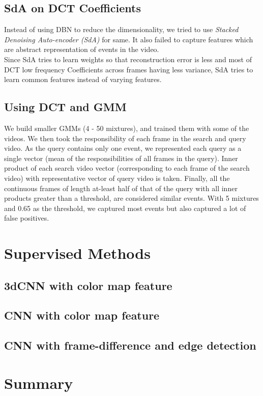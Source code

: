 \subsection{SdA on DCT Coefficients}
Instead of using DBN to reduce the dimensionality, we tried to use \textit{Stacked Denoising Auto-encoder (SdA)} for same. It also failed to capture features which are abstract representation of events in the video.\\
Since SdA tries to learn weights so that reconstruction error is less and most of DCT low frequency Coefficients across frames having less variance, SdA tries to learn common features instead of varying features.

\subsection{Using DCT and GMM}

We build smaller GMMs (4 - 50 mixtures), and trained them with some of the videos. We then took the responsibility of each frame in the search and query video. As the query contains only one event, we represented each query as a single vector (mean of the responsibilities of all frames in the query). Inner product of each search video vector (corresponding to each frame of the search video) with representative vector of query video is taken. Finally, all the continuous frames of length at-least half of that of the query with all inner products greater than a threshold, are considered similar events. With 5 mixtures and 0.65 as the threshold, we captured most events but also captured a lot of false positives.\\


\section{Supervised Methods}
\label{sec:event:supervised}
\subsection{3dCNN with color map feature}
\subsection{CNN with color map feature}
\subsection{CNN with frame-difference and edge detection}

\section{Summary}
